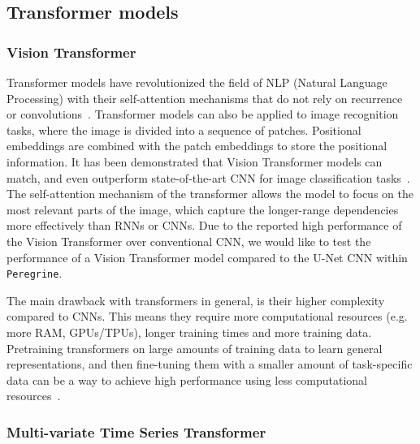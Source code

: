 
\subsection{Transformer models}

\subsubsection{Vision Transformer}

Transformer models have revolutionized the field of NLP (Natural Language Processing) with their self-attention mechanisms that do not rely on recurrence or convolutions~\cite{Vaswani_2017_transformer}. Transformer models can also be applied to image recognition tasks, where the image is divided into a sequence of patches. Positional embeddings are combined with the patch embeddings to store the positional information. It has been demonstrated that Vision Transformer models can match, and even outperform state-of-the-art CNN for image classification tasks~\cite{Dosovitskiy_2021_ViT}. The self-attention mechanism of the transformer allows the model to focus on the most relevant parts of the image, which capture the longer-range dependencies more effectively than RNNs or CNNs. Due to the reported high performance of the Vision Transformer over conventional CNN, we would like to test the performance of a Vision Transformer model compared to the U-Net CNN within \texttt{Peregrine}.

The main drawback with transformers in general, is their higher complexity compared to CNNs. This means they require more computational resources (e.g. more RAM, GPUs/TPUs), longer training times and more training data. Pretraining transformers on large amounts of training data to learn general representations, and then fine-tuning them with a smaller amount of task-specific data can be a way to achieve high performance using less computational resources~\cite{Tay_Dehghani_Rao_Fedus_Abnar_Chung_Narang_Yogatama_Vaswani_Metzler_2022}.

\subsubsection{Multi-variate Time Series Transformer}

